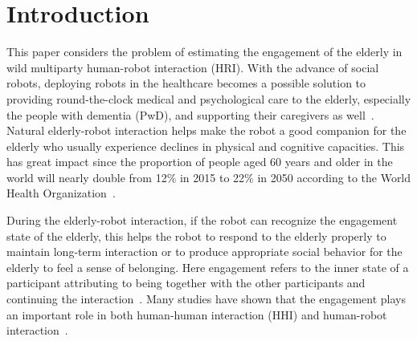 \documentclass[twocolumn]{svjour3}
\begin{document}
\section{Introduction}
\label{s:Introduction}

This paper considers the problem of estimating the engagement of the elderly in wild multiparty human-robot interaction (HRI). With the advance of social robots, deploying robots in the healthcare becomes a possible solution to providing round-the-clock medical and psychological care to the elderly, especially the people with dementia (PwD), and supporting their caregivers as well~\cite{Ghafurian2021Social, Perugia2020ENGAGEDEM}. Natural elderly-robot interaction helps make the robot a good companion for the elderly who usually experience declines in physical and cognitive capacities. This has great impact since the proportion of people aged 60 years and older in the world will nearly double from 12\% in 2015 to 22\% in 2050 according to the World Health Organization~\cite{WHO2021Ageing}. 

During the elderly-robot interaction, if the robot can recognize the engagement state of the elderly, this helps the robot to respond to the elderly properly to maintain long-term interaction or to produce appropriate social behavior for the elderly to feel a sense of belonging. Here engagement refers to the inner state of a participant attributing to being together with the other participants and continuing the interaction~\cite{Poggi2013Mind}. Many studies have shown that the engagement plays an important role in both human-human interaction (HHI) and human-robot interaction~\cite{Jones2018Engagement}. 
\end{document}
